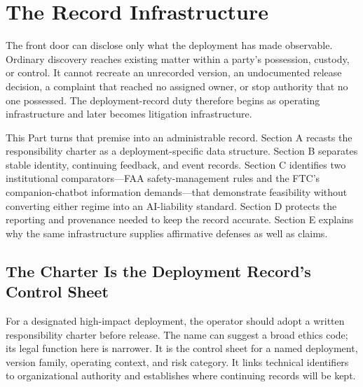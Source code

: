 \section{The Record Infrastructure}
\label{sec:infrastructure}

The front door can disclose only what the deployment has made observable. Ordinary discovery reaches existing matter within a party's possession, custody, or control. It cannot recreate an unrecorded version, an undocumented release decision, a complaint that reached no assigned owner, or stop authority that no one possessed. The deployment-record duty therefore begins as operating infrastructure and later becomes litigation infrastructure.

This Part turns that premise into an administrable record. Section A recasts the responsibility charter as a deployment-specific data structure. Section B separates stable identity, continuing feedback, and event records. Section C identifies two institutional comparators---FAA safety-management rules and the FTC's companion-chatbot information demands---that demonstrate feasibility without converting either regime into an AI-liability standard. Section D protects the reporting and provenance needed to keep the record accurate. Section E explains why the same infrastructure supplies affirmative defenses as well as claims.

\subsection{The Charter Is the Deployment Record's Control Sheet}

For a designated high-impact deployment, the operator should adopt a written responsibility charter before release. The name can suggest a broad ethics code; its legal function here is narrower. It is the control sheet for a named deployment, version family, operating context, and risk category. It links technical identifiers to organizational authority and establishes where continuing records will be kept.

